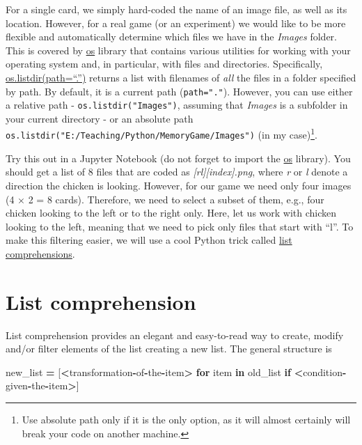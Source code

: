 \documentclass[
]{book}
\newenvironment{Shaded}{\begin{snugshade}}{\end{snugshade}}
\newcommand{\ControlFlowTok}[1]{\textcolor[rgb]{0.13,0.29,0.53}{\textbf{#1}}}
\newcommand{\KeywordTok}[1]{\textcolor[rgb]{0.13,0.29,0.53}{\textbf{#1}}}
\newcommand{\NormalTok}[1]{#1}
\newcommand{\OperatorTok}[1]{\textcolor[rgb]{0.81,0.36,0.00}{\textbf{#1}}}
\begin{document}
For a single card, we simply hard-coded the name of an image file, as well as its location. However, for a real game (or an experiment) we would like to be more flexible and automatically determine which files we have in the \emph{Images} folder. This is covered by \href{https://docs.python.org/3/library/os.html}{os} library that contains various utilities for working with your operating system and, in particular, with files and directories. Specifically, \href{https://docs.python.org/3/library/os.html\#os.listdir}{os.listdir(path=``.'')} returns a list with filenames of \emph{all} the files in a folder specified by path. By default, it is a current path (\texttt{path="."}). However, you can use either a relative path - \texttt{os.listdir("Images")}, assuming that \emph{Images} is a subfolder in your current directory - or an absolute path \texttt{os.listdir("E:/Teaching/Python/MemoryGame/Images")} (in my case)\footnote{Use absolute path only if it is the only option, as it will almost certainly will break your code on another machine.}.

Try this out in a Jupyter Notebook (do not forget to import the \href{https://docs.python.org/3/library/os.html\#module-os}{os} library). You should get a list of 8 files that are coded as \emph{{[}r\textbar l{]}{[}index{]}.png}, where \emph{r} or \emph{l} denote a direction the chicken is looking. However, for our game we need only four images (4 × 2 = 8 cards). Therefore, we need to select a subset of them, e.g., four chicken looking to the left or to the right only. Here, let us work with chicken looking to the left, meaning that we need to pick only files that start with ``l''. To make this filtering easier, we will use a cool Python trick called \href{https://docs.python.org/3/tutorial/datastructures.html\#list-comprehensions}{list comprehensions}.

\hypertarget{list-comprehension}{%
\section{List comprehension}\label{list-comprehension}}

List comprehension provides an elegant and easy-to-read way to create, modify and/or filter elements of the list creating a new list. The general structure is

\begin{Shaded}
\begin{Highlighting}[]
\NormalTok{new\_list }\OperatorTok{=}\NormalTok{ [}\OperatorTok{\textless{}}\NormalTok{transformation}\OperatorTok{{-}}\NormalTok{of}\OperatorTok{{-}}\NormalTok{the}\OperatorTok{{-}}\NormalTok{item}\OperatorTok{\textgreater{}} \ControlFlowTok{for}\NormalTok{ item }\KeywordTok{in}\NormalTok{ old\_list }\ControlFlowTok{if} \OperatorTok{\textless{}}\NormalTok{condition}\OperatorTok{{-}}\NormalTok{given}\OperatorTok{{-}}\NormalTok{the}\OperatorTok{{-}}\NormalTok{item}\OperatorTok{\textgreater{}}\NormalTok{]}
\end{Highlighting}
\end{Shaded}
\end{document}

